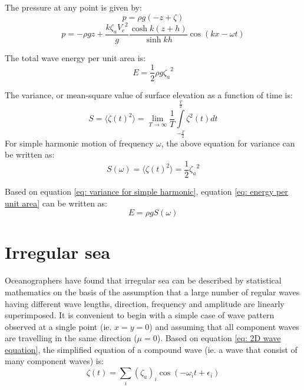 The pressure at any point is given by:
\begin{equation}
  p = \rho g (-z + \zeta)
\end{equation}
\begin{equation}
  p = - \rho g z + \frac{k \zeta_a {V_c}^2}{g} \frac{\cosh k(z + h)}{\sinh k h} 
  \cos (kx - \omega t)
  \label{eq: pressure variation}
\end{equation}

The total wave energy per unit area is:
\begin{equation}
  E = \frac{1}{2} \rho g {\zeta_a}^2
  \label{eq: energy per unit area}
\end{equation}

The variance, or mean-square value of surface elevation as a function of time
is:
\begin{equation}
  S = 
  \langle\zeta (t)^2 \rangle = 
  \lim_{T \to \infty} 
  \frac{1}{T} 
  \int\limits_{-\frac{T}{2}}^{\frac{T}{2}} 
  \zeta^2(t) dt
  \label{eq: variance}
\end{equation}
For simple harmonic motion of frequency $\omega$, the above equation for 
variance can be written as:
\begin{equation}
  S(\omega) = 
  \langle\zeta (t)^2 \rangle = 
  \frac{1}{2} {\zeta_a}^2
  \label{eq: variance for simple harmonic}
\end{equation}

Based on equation \ref{eq: variance for simple harmonic}, equation 
\ref{eq: energy per unit area} can be written as:
\begin{equation}
  E = \rho g S(\omega)
\end{equation}


\section{Irregular sea}

Oceanographers have found that irregular sea can be described by statistical
mathematics on the basis of the assumption that a large number of regular waves
having different wave lengths, direction, frequency and amplitude are linearly
superimposed. It is convenient to begin with a simple case of wave pattern
observed at a single point (ie. $x = y = 0$) and assuming that all component
waves are travelling in the same direction ($\mu = 0$). Based on equation 
\ref{eq: 2D wave equation}, the simplified equation of a compound wave (ie. a 
wave that consist of many component waves) is:
\begin{equation}
  \zeta(t) = \sum _{i} (\zeta_a)_i \cos(-\omega_i t + \epsilon_i)
  \label{eq: 2D irregular wave equation}
\end{equation}

